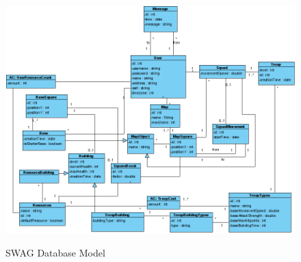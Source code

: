 \documentclass[a4paper]{article}
\begin{document}
\begin{figure}[ht!]
  \begin{center}
  \hspace*{-90pt}
  \includegraphics[scale=0.55]{fig/database_model.png}
  \label{fig:database_model}
	\caption{SWAG Database Model}
  \end{center}
\end{figure}

\hspace{0pt}

%
%
\end{document}
